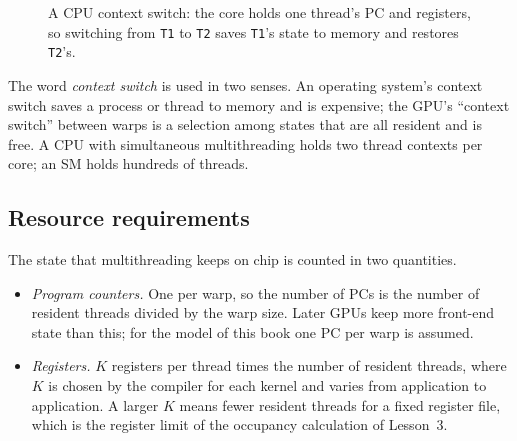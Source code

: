 \documentclass[../main.tex]{subfiles}
\begin{document}
\begin{figure}[htbp]
  \centering
  
  \caption{A CPU context switch: the core holds one thread's PC and
    registers, so switching from \texttt{T1} to \texttt{T2} saves
    \texttt{T1}'s state to memory and restores \texttt{T2}'s.}
  \label{fig:l04-context-switch}
\end{figure}

\begin{note}
  The word \emph{context switch} is used in two senses.  An operating
  system's context switch saves a process or thread to memory and is
  expensive; the GPU's \enquote{context switch} between
  warps is a selection among states that are all resident and is
  free.  A CPU with simultaneous
  multithreading holds two thread contexts per core; an SM holds
  hundreds of threads.
\end{note}

\subsection{Resource requirements}

The state that multithreading keeps on chip is counted in two
quantities.
\begin{itemize}
  \item \emph{Program counters.}  One per warp, so the number of PCs is
    the number of resident threads divided by the warp size.  Later
    GPUs keep more front-end state than this; for the model of this
    book one PC per warp is assumed.
  \item \emph{Registers.}  $K$ registers per thread times the number of
    resident threads, where $K$ is chosen by the compiler for each
    kernel and varies from application to application.  A larger $K$
    means fewer resident threads for a fixed register file, which is the
    register limit of the occupancy calculation of Lesson~3.
\end{itemize}
\end{document}
